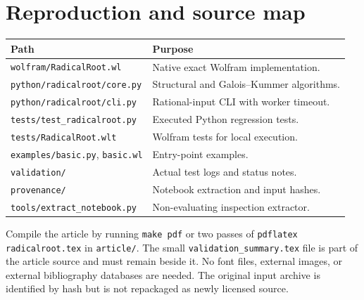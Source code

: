 \documentclass[11pt,a4paper]{article}
\newcommand{\code}[1]{\texttt{\small #1}}
\theoremstyle{definition}
\begin{document}
\section{Reproduction and source map}
\begin{center}
\begin{tabular}{@{}p{}p{}@{}}
\toprule
Path & Purpose\\
\midrule
\code{wolfram/RadicalRoot.wl} & Native exact Wolfram implementation.\\
\code{python/radicalroot/core.py} & Structural and Galois--Kummer algorithms.\\
\code{python/radicalroot/cli.py} & Rational-input CLI with worker timeout.\\
\code{tests/test\_radicalroot.py} & Executed Python regression tests.\\
\code{tests/RadicalRoot.wlt} & Wolfram tests for local execution.\\
\code{examples/basic.py}, \code{basic.wl} & Entry-point examples.\\
\code{validation/} & Actual test logs and status notes.\\
\code{provenance/} & Notebook extraction and input hashes.\\
\code{tools/extract\_notebook.py} & Non-evaluating inspection extractor.\\
\bottomrule
\end{tabular}
\end{center}
Compile the article by running \code{make pdf} or two passes of
\code{pdflatex radicalroot.tex} in \code{article/}. The small
\code{validation\_summary.tex} file is part of the article source and must remain
beside it. No font files, external images, or external bibliography databases
are needed. The original input archive is identified by hash but is not
repackaged as newly licensed source.
\end{document}
